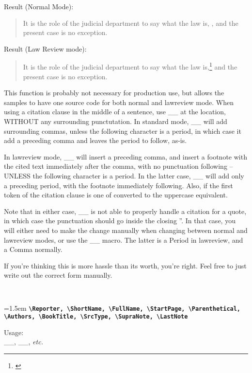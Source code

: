 \noindent Result (Normal Mode):

 \begin{quote}It is the role of the judicial department to say what the law is, \see \cite[s]{Marbury}, and the present case is no exception.\end{quote}

\noindent Result (Law Review mode):

 \begin{quote}It is the role of the judicial department to say what the law is,\footnote{\See \cite[s]{Marbury}} and the present case is no exception.\end{quote}

 \noindent This function is probably not necessary for production use, but allows the samples to have one source code for both
 normal and lawreview mode. When using a citation clause in the middle of a sentence, use _\citeclause_ at the location,
 WITHOUT any surrounding punctutation. In standard mode, _\citeclause_ will add surrounding commas, unless the following
 character is a period, in which case it add a preceding comma and leaves the period to follow, as-is.

 In lawreview mode, _\citeclause_ will insert a preceding comma, and insert a footnote with the cited text immediately 
 after the comma, with no punctuation following -- UNLESS the following character is a period. In the latter case, 
 _\citeclause_ will add only a preceding period, with the footnote immediately following. Also, if the first token of the 
 citation clause is one of %
 converted to the uppercase equivalent.

 Note that in either case, _\citeclause_ is not able to properly handle a citation for a quote, in which case the punctuation
 should go inside the closing ''. In that case, you will either need to make the change manually when changing between
 normal and lawreview modes, or use the _\PeriodOrComma_ macro. The latter is a Period in lawreview, and a Comma normally. 

 If you're thinking this is more hassle than its worth, you're right. Feel free to just write out the correct form manually.


~\par

\noindent
\begingroup\raggedright{}\hangindent=1.5em
\texttt{\bf \textbackslash{}Reporter, \textbackslash{}ShortName, \textbackslash{}FullName, \textbackslash{}StartPage, \textbackslash{}Parenthetical, \textbackslash{}Authors, \textbackslash{}BookTitle, \textbackslash{}SrcType, \textbackslash{}SupraNote, \textbackslash{}LastNote} \par\noindent
\endgroup
 Usage: \\
	_\Reporter_, _\StartPage_, \emph{etc.}

